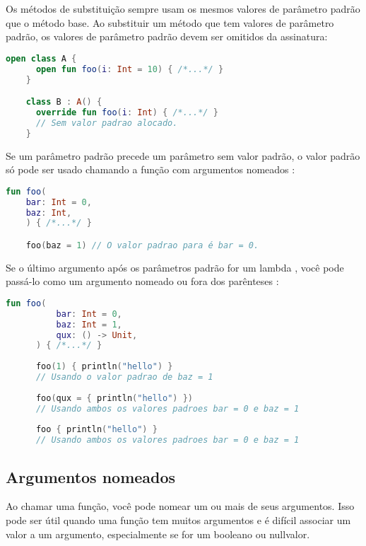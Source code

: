 Os métodos de substituição sempre usam os mesmos valores de parâmetro padrão que o método base. Ao substituir um método que tem valores de parâmetro padrão, os valores de parâmetro padrão devem ser omitidos da assinatura:
\begin{lstlisting}[label={lst:example1}, language=Kotlin]
    open class A {
      open fun foo(i: Int = 10) { /*...*/ }
    }

    class B : A() {
      override fun foo(i: Int) { /*...*/ }  
      // Sem valor padrao alocado.
    }
    \end{lstlisting}

Se um parâmetro padrão precede um parâmetro sem valor padrão, o valor padrão só pode ser usado chamando a função com argumentos nomeados :

\begin{lstlisting}[label={lst:example1}, language=Kotlin]
      fun foo(
    bar: Int = 0,
    baz: Int,
    ) { /*...*/ }

    foo(baz = 1) // O valor padrao para é bar = 0.
      \end{lstlisting}

Se o último argumento após os parâmetros padrão for um lambda , você pode passá-lo como um argumento nomeado ou fora dos parênteses :
\begin{lstlisting}[label={lst:example1}, language=Kotlin]
        fun foo(
          bar: Int = 0,
          baz: Int = 1,
          qux: () -> Unit,
      ) { /*...*/ }
      
      foo(1) { println("hello") }     
      // Usando o valor padrao de baz = 1
      
      foo(qux = { println("hello") }) 
      // Usando ambos os valores padroes bar = 0 e baz = 1
      
      foo { println("hello") }        
      // Usando ambos os valores padroes bar = 0 e baz = 1
        \end{lstlisting}


\subsection{Argumentos nomeados}

Ao chamar uma função, você pode nomear um ou mais de seus argumentos. Isso pode ser útil quando uma função tem muitos argumentos e é difícil associar um valor a um argumento, especialmente se for um booleano ou nullvalor.

